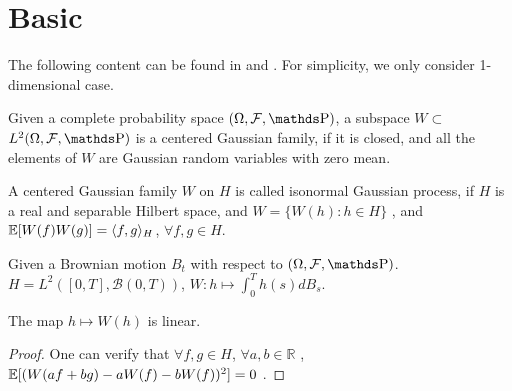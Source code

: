 \chapter{Basic}

The following content can be found in 
\cite{TheMalliavinCalculusandRelatedTopics} and 
\cite{IntroductiontoMalliavinCalculus}. 
For simplicity, we only consider 1-dimensional case. 

\begin{definition}
Given a complete probability space $(\Omega, \mathcal{F}, \Prob)$, 
a subspace $W \subset$ $L^2(\Omega, \mathcal{F}, \Prob)$ is a centered Gaussian family, if it is closed, and all the elements of $W$ are
Gaussian random variables with zero mean. 
\end{definition}


\begin{definition}
A centered Gaussian family $W$ on $H$ is called isonormal Gaussian process, 
if $H$ is a real and separable Hilbert space, 
and $W = \{W(h): h \in H \}$
, and $\operatorname{\mathbb{E}}[W(f)W(g)] = \langle f, g \rangle_{H}$, $\forall f, g \in H$. 
\end{definition}

\begin{example}
Given a Brownian motion $B_t$ with respect to $(\Omega, \mathcal{F}, \Prob)$. 
$H = L^2([0, T], \mathcal{B}(0, T))$, 
$W: h \mapsto \int_{0}^{T} h(s) d B_s$. 
\end{example}

\begin{property}
    The map $h \mapsto W(h)$ is linear. 
\end{property}

\begin{proof}
    One can verify that $\forall f, g \in H$, $\forall a, b \in \mathbb{R}$
    , $\operatorname{\mathbb{E}}[(W(af+bg) - aW(f) - bW(f))^2] = 0$ . 
\end{proof}
